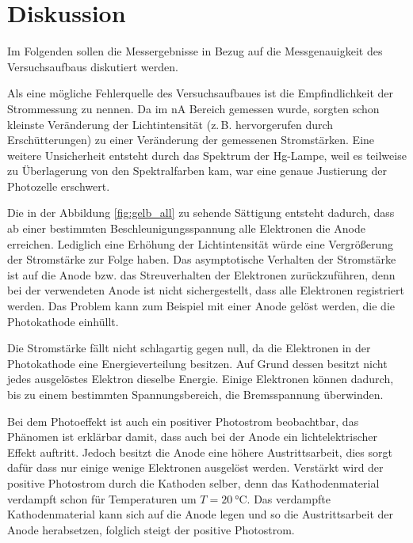 \section{Diskussion}
Im Folgenden sollen die Messergebnisse in Bezug auf die Messgenauigkeit des
Versuchsaufbaus diskutiert werden. %

Als eine mögliche Fehlerquelle des Versuchsaufbaues ist die Empfindlichkeit der
Strommessung zu nennen. Da im $\si{\nano\ampere}$ Bereich gemessen wurde, sorgten schon kleinste %
Veränderung der Lichtintensität (z.\,B. hervorgerufen durch Erschütterungen) zu einer Veränderung der gemessenen Stromstärken. %
Eine weitere Unsicherheit entsteht durch das Spektrum der Hg-Lampe,  %
weil es teilweise zu Überlagerung von den Spektralfarben kam, war eine genaue Justierung der Photozelle erschwert.

Die in der Abbildung \ref{fig:gelb_all} zu sehende Sättigung entsteht dadurch, dass
ab einer bestimmten Beschleunigungsspannung alle Elektronen die Anode erreichen.
Lediglich eine Erhöhung der Lichtintensität würde eine Vergrößerung der Stromstärke
zur Folge haben. %
Das asymptotische Verhalten der Stromstärke ist auf die Anode
bzw. das Streuverhalten der Elektronen zurückzuführen, denn bei der verwendeten %
Anode ist nicht sichergestellt, dass alle Elektronen registriert werden. %
Das Problem kann zum Beispiel mit einer Anode gelöst werden, die die Photokathode
einhüllt.

Die Stromstärke fällt nicht schlagartig gegen null, da die Elektronen in der Photokathode
eine Energieverteilung besitzen. Auf Grund dessen besitzt nicht jedes ausgelöstes
Elektron dieselbe Energie. Einige Elektronen können dadurch, bis zu einem bestimmten Spannungsbereich,
die Bremsspannung überwinden.

Bei dem Photoeffekt ist auch ein positiver Photostrom beobachtbar, das
Phänomen ist erklärbar damit, dass auch bei der Anode ein lichtelektrischer Effekt
auftritt. Jedoch besitzt die Anode eine höhere Austrittsarbeit, dies sorgt
dafür dass nur einige wenige Elektronen ausgelöst werden.
Verstärkt wird der positive Photostrom durch die Kathoden selber, %
denn das Kathodenmaterial verdampft schon für Temperaturen um
$T=\SI{20}{\celsius}$. Das verdampfte Kathodenmaterial kann sich auf die
Anode legen und so die Austrittsarbeit der Anode herabsetzen, folglich steigt der
positive Photostrom.

